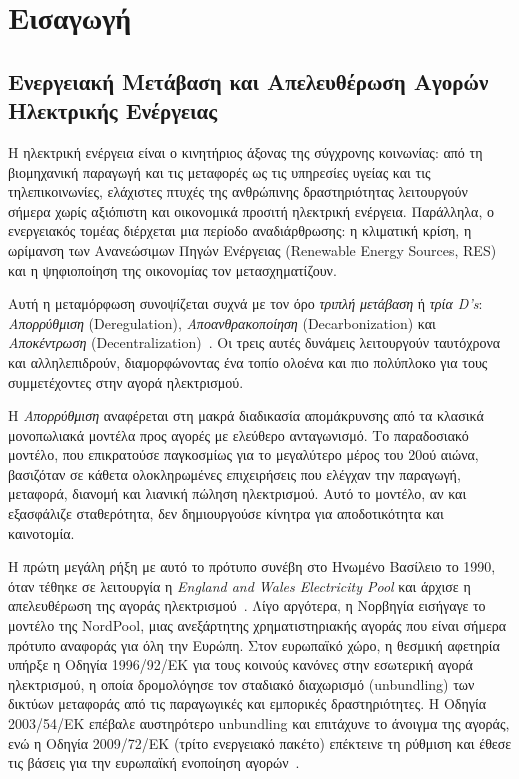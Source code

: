 \chapter{Εισαγωγή}
\label{ch:intro}

\section{Ενεργειακή Μετάβαση και Απελευθέρωση Αγορών Ηλεκτρικής Ενέργειας}
\label{sec:energy_transition}

Η ηλεκτρική ενέργεια είναι ο κινητήριος άξονας της σύγχρονης κοινωνίας: από
τη βιομηχανική παραγωγή και τις μεταφορές ως τις υπηρεσίες υγείας και τις τηλεπικοινωνίες,
ελάχιστες πτυχές της ανθρώπινης δραστηριότητας λειτουργούν σήμερα χωρίς αξιόπιστη
και οικονομικά προσιτή ηλεκτρική ενέργεια. Παράλληλα, ο ενεργειακός τομέας διέρχεται μια περίοδο αναδιάρθρωσης: η κλιματική κρίση, η ωρίμανση των Ανανεώσιμων Πηγών Ενέργειας
(Renewable Energy Sources, RES) και η ψηφιοποίηση της οικονομίας τον μετασχηματίζουν.

Αυτή η μεταμόρφωση συνοψίζεται συχνά με τον όρο \textit{τριπλή μετάβαση} ή \textit{τρία D's}:
\textit{Απορρύθμιση} (Deregulation), \textit{Αποανθρακοποίηση} (Decarbonization) και
\textit{Αποκέντρωση} (Decentralization)~\cite{weron2014electricity}. Οι τρεις αυτές δυνάμεις
λειτουργούν ταυτόχρονα και αλληλεπιδρούν, διαμορφώνοντας ένα τοπίο ολοένα
και πιο πολύπλοκο για τους συμμετέχοντες στην αγορά ηλεκτρισμού.

Η \textit{Απορρύθμιση} αναφέρεται στη μακρά διαδικασία απομάκρυνσης από τα κλασικά
μονοπωλιακά μοντέλα προς αγορές με ελεύθερο ανταγωνισμό. Το παραδοσιακό μοντέλο,
που επικρατούσε παγκοσμίως για το μεγαλύτερο μέρος του 20ού αιώνα, βασιζόταν σε κάθετα
ολοκληρωμένες επιχειρήσεις που ελέγχαν την παραγωγή, μεταφορά, διανομή και λιανική
πώληση ηλεκτρισμού. Αυτό το μοντέλο, αν και εξασφάλιζε σταθερότητα, δεν δημιουργούσε
κίνητρα για αποδοτικότητα και καινοτομία.

Η πρώτη μεγάλη ρήξη με αυτό το πρότυπο συνέβη στο Ηνωμένο Βασίλειο το 1990, όταν
τέθηκε σε λειτουργία η \textit{England and Wales Electricity Pool} και άρχισε η απελευθέρωση
της αγοράς ηλεκτρισμού~\cite{weron2014electricity}. Λίγο αργότερα, η Νορβηγία εισήγαγε το μοντέλο
της NordPool, μιας ανεξάρτητης χρηματιστηριακής αγοράς που είναι σήμερα πρότυπο
αναφοράς για όλη την Ευρώπη. Στον ευρωπαϊκό χώρο, η θεσμική αφετηρία υπήρξε η
Οδηγία 1996/92/ΕΚ για τους κοινούς κανόνες στην εσωτερική αγορά ηλεκτρισμού, η οποία
δρομολόγησε τον σταδιακό διαχωρισμό (unbundling) των δικτύων μεταφοράς από τις παραγωγικές
και εμπορικές δραστηριότητες. Η Οδηγία 2003/54/ΕΚ επέβαλε αυστηρότερο unbundling και
επιτάχυνε το άνοιγμα της αγοράς, ενώ η Οδηγία 2009/72/ΕΚ (τρίτο ενεργειακό πακέτο)
επέκτεινε τη ρύθμιση και έθεσε τις βάσεις για την ευρωπαϊκή ενοποίηση αγορών~\cite{eu_directives_electricity}.

